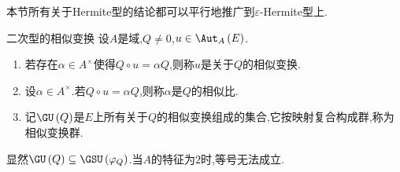 \begin{remark}{}{}
	本节所有关于Hermite型的结论都可以平行地推广到$\varepsilon$-Hermite型上.
\end{remark}

\begin{definition}{二次型的相似变换}{}
	设$A$是域,$Q\neq 0$,$u\in\Aut_{A}\left(E\right)$.
	\begin{enumerate}
		\item 若存在$\alpha\in A^{\times}$使得$Q\circ u=\alpha Q$,则称$u$是关于$Q$的相似变换.
		\item 设$\alpha\in A^{\times}$.若$Q\circ u=\alpha Q$,则称$\alpha$是$Q$的相似比.
		\item 记$\GU\left(Q\right)$是$E$上所有关于$Q$的相似变换组成的集合,它按映射复合构成群,称为相似变换群.
	\end{enumerate}
\end{definition}

\begin{remark}{}{}
	显然$\GU\left(Q\right)\subseteq\GSU\left(\varphi_{Q}\right)$.当$A$的特征为$2$时,等号无法成立.
\end{remark}



